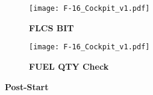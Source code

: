 \documentclass[fontInter]{TechCheck}
\begin{document}
	\begin{figure}[h]
		\centering
		\begin{subfigure}[t]{0.45\linewidth}
			\centering
			\texttt{[image: F-16\_Cockpit\_v1.pdf]}
			\caption*{\textbf{FLCS BIT}}
		\end{subfigure}
		\begin{subfigure}[t]{0.45\linewidth}
			\centering
			\texttt{[image: F-16\_Cockpit\_v1.pdf]}
			\caption*{\textbf{FUEL QTY Check}}
		\end{subfigure}
		\caption{\textbf{Post-Start}}
		\label{fig:proc:poststart3}
	\end{figure}

	\clearpage
\end{document}
